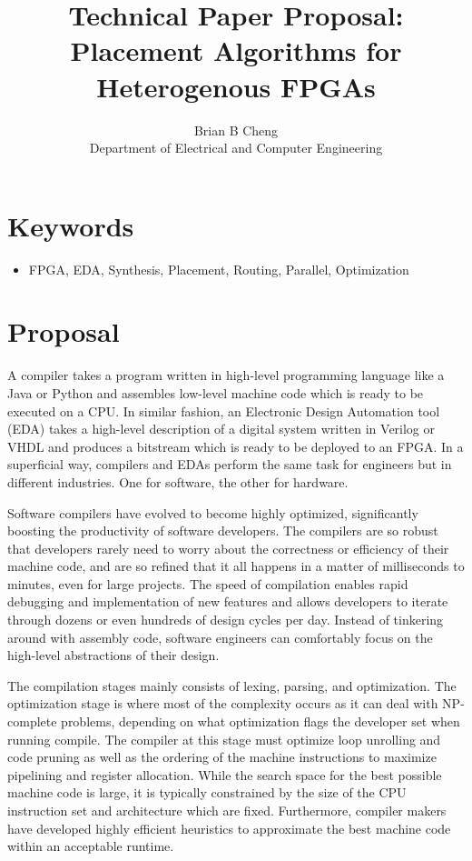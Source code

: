 \documentclass{article}
\begin{document}
\title{Technical Paper Proposal: \\ Placement Algorithms for Heterogenous FPGAs}
\author{Brian B Cheng \\ Department of Electrical and Computer Engineering}


\date{}
\maketitle

\section{Keywords}
\begin{itemize}
    \item FPGA, EDA, Synthesis, Placement, Routing, Parallel, Optimization
\end{itemize}


\section{Proposal}
    A compiler takes a program written in high-level programming language like a Java or Python and assembles low-level machine code which is ready to be executed on a CPU.
    In similar fashion, an Electronic Design Automation tool (EDA) takes a high-level description of a digital system written in Verilog or VHDL and produces a bitstream which is ready to be deployed to an FPGA.
    In a superficial way, compilers and EDAs perform the same task for engineers but in different industries. 
    One for software, the other for hardware.

    Software compilers have evolved to become highly optimized, significantly boosting the productivity of software developers. 
    The compilers are so robust that developers rarely need to worry about the correctness or efficiency of their machine code, and are so refined that it all happens in a matter of milliseconds to minutes, even for large projects. %
    The speed of compilation enables rapid debugging and implementation of new features and allows developers to iterate through dozens or even hundreds of design cycles per day.
    Instead of tinkering around with assembly code, software engineers can comfortably focus on the high-level abstractions of their design. 

    The compilation stages mainly consists of lexing, parsing, and optimization.
    The optimization stage is where most of the complexity occurs as it can deal with NP-complete problems, depending on what optimization flags the developer set when running compile.
    The compiler at this stage must optimize loop unrolling and code pruning as well as the ordering of the machine instructions to maximize pipelining and register allocation.
    While the search space for the best possible machine code is large, it is typically constrained by the size of the CPU instruction set and architecture which are fixed.
    Furthermore, compiler makers have developed highly efficient heuristics to approximate the best machine code within an acceptable runtime.
\end{document}
